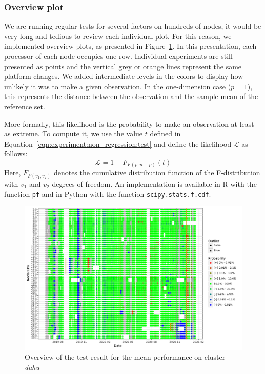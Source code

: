             \subsubsection{Overview plot}%

                We are running regular tests for several factors on hundreds of nodes, it would be very long and tedious
                to review each individual plot. For this reason, we implemented overview plots, as presented in
                Figure~\ref{fig:experiment:non_regression:overview}. In this presentation, each processor of each node
                occupies one row. Individual experiments are still presented as points and the vertical grey or orange
                lines represent the same platform changes. We added intermediate levels in the colors to display how
                unlikely it was to make a given observation. In the one-dimension case (\ie \(p=1\)), this represents
                the distance between the observation and the sample mean of the reference set.

                More formally, this likelihood is the probability to make an observation at least as extreme. To compute
                it, we use the value \(t\) defined in Equation~\ref{eqn:experiment:non_regression:test} and define the
                likelihood \(\mathcal{L}\) as follows:
                \begin{equation}\label{eqn:experiment:non_regression:likelihood}
                    \mathcal{L} = 1-F_{F(p, n-p)}(t)
                \end{equation}
                Here, \(F_{F(v_1, v_2)}\) denotes the cumulative distribution function of the F-distribution with
                \(v_1\) and \(v_2\) degrees of freedom. An implementation is available in R with the function
                \texttt{pf} and in Python with the function
                \texttt{scipy.stats.f.cdf}.

                \begin{figure}[htpb]
                    \centering
                    \includegraphics[width=\linewidth]{img/experiment/non_regression/implementation/overview.pdf}
                    \caption{Overview of the test result for the mean performance on cluster \emph{dahu}}%
                    \label{fig:experiment:non_regression:overview}
                \end{figure}

